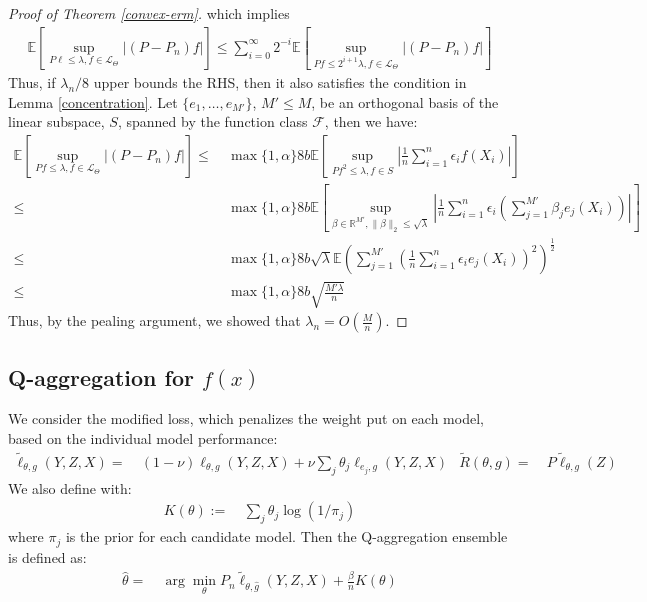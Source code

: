 \documentclass[12pt]{extarticle} %
\newcommand{\E}{\mathbb{E}}
\begin{document}
\begin{proof}[Proof of Theorem \ref{convex-erm}]
which implies
\begin{align*}
\E\left[\sup_{P\ell\leq\lambda, f \in \mathcal{L}_{\Theta}}|(P-P_n)f|\right]\leq \sum_{i=0}^{\infty}2^{-i}\E\left[\sup_{Pf\leq 2^{i+1}\lambda, f \in \mathcal{L}_{\Theta}}|(P-P_n)f|\right]
\end{align*}
Thus, if $\lambda_n/8$ upper bounds the RHS, then it also satisfies the condition in Lemma \ref{concentration}. 
Let $\{e_1, \dots, e_{M'}\}$, $M'\leq M$, be an orthogonal basis of the linear subspace, $S$, spanned by the function class $\mathcal{F}$, then we have:
\begin{align*}
    \E\left[\sup_{Pf\leq\lambda, f \in \mathcal{L}_{\Theta}}|(P-P_n)f|\right] \leq~& \max\{1,\alpha\}8b \E\left[\sup_{Pf^2\leq\lambda , f \in S}\left|\frac{1}{n}\sum_{i=1}^n \epsilon_i f(X_i)\right|\right] \tag{By Symmetrization}\\
    \leq~& \max\{1,\alpha\}8b \E\left[\sup_{\beta\in \mathbb{R}^{M'} , \|\beta\|_2 \leq \sqrt{\lambda}}\left|\frac{1}{n}\sum_{i=1}^n \epsilon_i \left(\sum_{j=1}^{M'}\beta_j e_j(X_i)\right)\right|\right]\\
    \leq~& \max\{1,\alpha\}8b\sqrt{\lambda}\E\left(\sum_{j=1}^{M'}\left(\frac{1}{n}\sum_{i=1}^{n}\epsilon_i e_j(X_i)\right)^2\right)^{\frac{1}{2}} \tag{By the Cauchy-Schwarz inequality}\\
    \leq~& \max\{1,\alpha\}8b\sqrt{\frac{M'\lambda}{n}}
\end{align*}
Thus, by the pealing argument, we showed that $\lambda_n = O\left(\frac{M}{n}\right)$.
\end{proof}


\subsection{Q-aggregation for $f(x)$}
We consider the modified loss, which penalizes the weight put on each model, based on the individual model performance:
\begin{align*}
    \tilde{\ell}_{\theta,g}(Y,Z,X) =~& (1-\nu) \ell_{\theta,g}(Y,Z,X) + \nu \sum_{j} \theta_j \ell_{e_j,g}(Y,Z,X) &
    \tilde{R}(\theta,g) =~& P\tilde{\ell}_{\theta,g}(Z)
\end{align*}
We also define with:
\begin{align*}
    K(\theta) :=~&\sum_{j} \theta_j \log(1/\pi_j)
\end{align*} where $\pi_j$ is the prior for each candidate model.
Then the Q-aggregation ensemble is defined as:
\begin{align*}
    \hat{\theta} =~& \arg\min_{\theta} P_n\tilde{\ell}_{\theta, \hat{g}}(Y,Z,X) + \frac{\beta}{n} K(\theta)
\end{align*}
\end{document}
